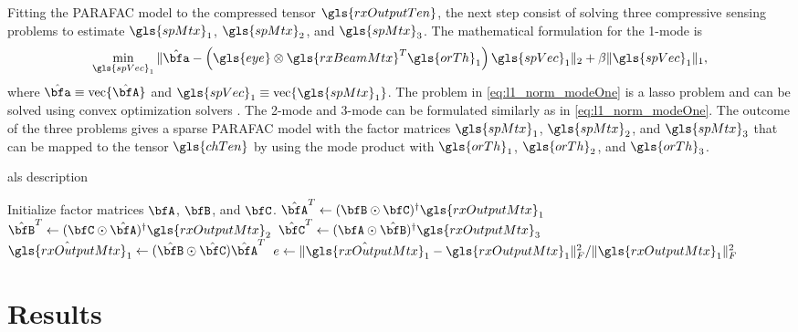 \documentclass[conference]{IEEEtran}
\begin{document}
Fitting the \gls{PARAFAC} model to the compressed tensor $\gls{rxOutputTen}$,
the next step consist of solving three compressive sensing problems to estimate
$\gls{spMtx}_1$, $\gls{spMtx}_2$, and $\gls{spMtx}_3$. The mathematical
formulation for the 1-mode is
\begin{equation}
  \label{eq:l1_norm_modeOne}
  \min_{\gls{spVec}_1} \|\hat{\bfa} - \left( \gls{eye} \otimes \gls{rxBeamMtx}^T\gls{orTh}_1\right) \gls{spVec}_1\|_2 + \beta \|\gls{spVec}_1\|_1, 
\end{equation}
where $\hat{\bfa} \equiv \textrm{vec}\{\hat{\bfA}\}$ and  $\gls{spVec}_1 \equiv
\textrm{vec}\{\gls{spMtx}_1\}$. The problem in \eqref{eq:l1_norm_modeOne} is a
\gls{lasso} problem and can be solved using convex optimization solvers
\cite{Boyd:2004}. The 2-mode and 3-mode can be formulated similarly as in
\eqref{eq:l1_norm_modeOne}. The outcome of the three problems gives a sparse \gls{PARAFAC} model with
the factor matrices $\gls{spMtx}_1$, $\gls{spMtx}_2$, and $\gls{spMtx}_3$ that
can be mapped to the tensor $\gls{chTen}$ by using the mode product with
$\gls{orTh}_1$,  $\gls{orTh}_2$, and $\gls{orTh}_3$.


\label{sec:algorithm}
\begin{algorithm}   
    \caption{\gls{als} description } \label{alg.:als}
    \begin{algorithmic}
      \STATE Initialize factor matrices $\bfA$, $\bfB$, and $\bfC$.
      \STATE $\hat{\bfA}^T \gets (\bfB \odot \bfC)^{\dagger}\gls{rxOutputMtx}_1 $
      \STATE $\hat{\bfB}^T \gets (\bfC \odot \hat{\bfA})^{\dagger}\gls{rxOutputMtx}_2 $
      \STATE $\hat{\bfC}^T \gets ({\bfA} \odot \hat{\bfB})^{\dagger}\gls{rxOutputMtx}_3 $
      \STATE $\hat{\gls{rxOutputMtx}}_1 \gets (\hat{\bfB} \odot \hat{\bfC})\hat{\bfA}^T$
      \STATE $ e \gets \|\hat{\gls{rxOutputMtx}}_1 - \gls{rxOutputMtx}_1 \|^2_F/ \|\gls{rxOutputMtx}_1\|_F^2$
      \ENDWHILE

      
    \end{algorithmic}
\end{algorithm}

\section{Results}
\end{document}
